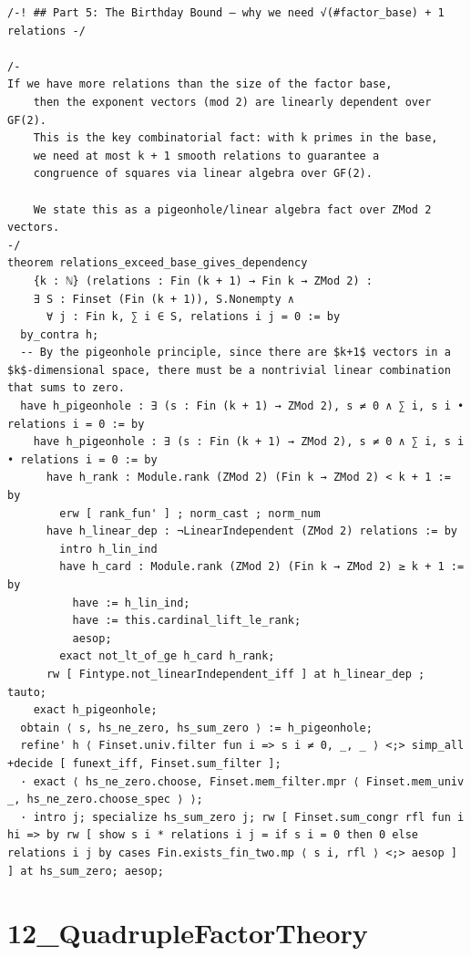 \documentclass[11pt,openany]{book}
\theoremstyle{definition}
\theoremstyle{plain}
\theoremstyle{remark}
\begin{document}
\begin{lstlisting}[style=lean]
/-! ## Part 5: The Birthday Bound — why we need √(#factor_base) + 1 relations -/

/-
If we have more relations than the size of the factor base,
    then the exponent vectors (mod 2) are linearly dependent over GF(2).
    This is the key combinatorial fact: with k primes in the base,
    we need at most k + 1 smooth relations to guarantee a
    congruence of squares via linear algebra over GF(2).

    We state this as a pigeonhole/linear algebra fact over ZMod 2 vectors.
-/
theorem relations_exceed_base_gives_dependency
    {k : ℕ} (relations : Fin (k + 1) → Fin k → ZMod 2) :
    ∃ S : Finset (Fin (k + 1)), S.Nonempty ∧
      ∀ j : Fin k, ∑ i ∈ S, relations i j = 0 := by
  by_contra h;
  -- By the pigeonhole principle, since there are $k+1$ vectors in a $k$-dimensional space, there must be a nontrivial linear combination that sums to zero.
  have h_pigeonhole : ∃ (s : Fin (k + 1) → ZMod 2), s ≠ 0 ∧ ∑ i, s i • relations i = 0 := by
    have h_pigeonhole : ∃ (s : Fin (k + 1) → ZMod 2), s ≠ 0 ∧ ∑ i, s i • relations i = 0 := by
      have h_rank : Module.rank (ZMod 2) (Fin k → ZMod 2) < k + 1 := by
        erw [ rank_fun' ] ; norm_cast ; norm_num
      have h_linear_dep : ¬LinearIndependent (ZMod 2) relations := by
        intro h_lin_ind
        have h_card : Module.rank (ZMod 2) (Fin k → ZMod 2) ≥ k + 1 := by
          have := h_lin_ind;
          have := this.cardinal_lift_le_rank;
          aesop;
        exact not_lt_of_ge h_card h_rank;
      rw [ Fintype.not_linearIndependent_iff ] at h_linear_dep ; tauto;
    exact h_pigeonhole;
  obtain ⟨ s, hs_ne_zero, hs_sum_zero ⟩ := h_pigeonhole;
  refine' h ⟨ Finset.univ.filter fun i => s i ≠ 0, _, _ ⟩ <;> simp_all +decide [ funext_iff, Finset.sum_filter ];
  · exact ⟨ hs_ne_zero.choose, Finset.mem_filter.mpr ⟨ Finset.mem_univ _, hs_ne_zero.choose_spec ⟩ ⟩;
  · intro j; specialize hs_sum_zero j; rw [ Finset.sum_congr rfl fun i hi => by rw [ show s i * relations i j = if s i = 0 then 0 else relations i j by cases Fin.exists_fin_two.mp ⟨ s i, rfl ⟩ <;> aesop ] ] at hs_sum_zero; aesop;
\end{lstlisting}

\clearpage

\section*{12\_QuadrupleFactorTheory}
\end{document}
